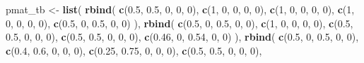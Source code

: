 \documentclass[
  chinese,
]{article}
\newenvironment{Shaded}{\begin{snugshade}}{\end{snugshade}}
\newcommand{\DecValTok}[1]{\textcolor[rgb]{0.00,0.00,0.81}{#1}}
\newcommand{\FloatTok}[1]{\textcolor[rgb]{0.00,0.00,0.81}{#1}}
\newcommand{\FunctionTok}[1]{\textcolor[rgb]{0.13,0.29,0.53}{\textbf{#1}}}
\newcommand{\NormalTok}[1]{#1}
\newcommand{\OtherTok}[1]{\textcolor[rgb]{0.56,0.35,0.01}{#1}}
\begin{document}
\begin{Shaded}
\begin{Highlighting}[]
\NormalTok{pmat\_tb }\OtherTok{\textless{}{-}} \FunctionTok{list}\NormalTok{(}
  \FunctionTok{rbind}\NormalTok{(}
    \FunctionTok{c}\NormalTok{(}\FloatTok{0.5}\NormalTok{, }\FloatTok{0.5}\NormalTok{, }\DecValTok{0}\NormalTok{, }\DecValTok{0}\NormalTok{, }\DecValTok{0}\NormalTok{),}
    \FunctionTok{c}\NormalTok{(}\DecValTok{1}\NormalTok{, }\DecValTok{0}\NormalTok{, }\DecValTok{0}\NormalTok{, }\DecValTok{0}\NormalTok{, }\DecValTok{0}\NormalTok{),}
    \FunctionTok{c}\NormalTok{(}\DecValTok{1}\NormalTok{, }\DecValTok{0}\NormalTok{, }\DecValTok{0}\NormalTok{, }\DecValTok{0}\NormalTok{, }\DecValTok{0}\NormalTok{),}
    \FunctionTok{c}\NormalTok{(}\DecValTok{1}\NormalTok{, }\DecValTok{0}\NormalTok{, }\DecValTok{0}\NormalTok{, }\DecValTok{0}\NormalTok{, }\DecValTok{0}\NormalTok{),}
    \FunctionTok{c}\NormalTok{(}\FloatTok{0.5}\NormalTok{, }\DecValTok{0}\NormalTok{, }\FloatTok{0.5}\NormalTok{, }\DecValTok{0}\NormalTok{, }\DecValTok{0}\NormalTok{)}
\NormalTok{  ),}
  \FunctionTok{rbind}\NormalTok{(}
    \FunctionTok{c}\NormalTok{(}\FloatTok{0.5}\NormalTok{, }\DecValTok{0}\NormalTok{, }\FloatTok{0.5}\NormalTok{, }\DecValTok{0}\NormalTok{, }\DecValTok{0}\NormalTok{),}
    \FunctionTok{c}\NormalTok{(}\DecValTok{1}\NormalTok{, }\DecValTok{0}\NormalTok{, }\DecValTok{0}\NormalTok{, }\DecValTok{0}\NormalTok{, }\DecValTok{0}\NormalTok{),}
    \FunctionTok{c}\NormalTok{(}\FloatTok{0.5}\NormalTok{, }\FloatTok{0.5}\NormalTok{, }\DecValTok{0}\NormalTok{, }\DecValTok{0}\NormalTok{, }\DecValTok{0}\NormalTok{),}
    \FunctionTok{c}\NormalTok{(}\FloatTok{0.5}\NormalTok{, }\FloatTok{0.5}\NormalTok{, }\DecValTok{0}\NormalTok{, }\DecValTok{0}\NormalTok{, }\DecValTok{0}\NormalTok{),}
    \FunctionTok{c}\NormalTok{(}\FloatTok{0.46}\NormalTok{, }\DecValTok{0}\NormalTok{, }\FloatTok{0.54}\NormalTok{, }\DecValTok{0}\NormalTok{, }\DecValTok{0}\NormalTok{)}
\NormalTok{  ),}
  \FunctionTok{rbind}\NormalTok{(}
    \FunctionTok{c}\NormalTok{(}\FloatTok{0.5}\NormalTok{, }\DecValTok{0}\NormalTok{, }\FloatTok{0.5}\NormalTok{, }\DecValTok{0}\NormalTok{, }\DecValTok{0}\NormalTok{),}
    \FunctionTok{c}\NormalTok{(}\FloatTok{0.4}\NormalTok{, }\FloatTok{0.6}\NormalTok{, }\DecValTok{0}\NormalTok{, }\DecValTok{0}\NormalTok{, }\DecValTok{0}\NormalTok{),}
    \FunctionTok{c}\NormalTok{(}\FloatTok{0.25}\NormalTok{, }\FloatTok{0.75}\NormalTok{, }\DecValTok{0}\NormalTok{, }\DecValTok{0}\NormalTok{, }\DecValTok{0}\NormalTok{),}
    \FunctionTok{c}\NormalTok{(}\FloatTok{0.5}\NormalTok{, }\FloatTok{0.5}\NormalTok{, }\DecValTok{0}\NormalTok{, }\DecValTok{0}\NormalTok{, }\DecValTok{0}\NormalTok{),}

\end{Highlighting}
\end{Shaded}
\end{document}
